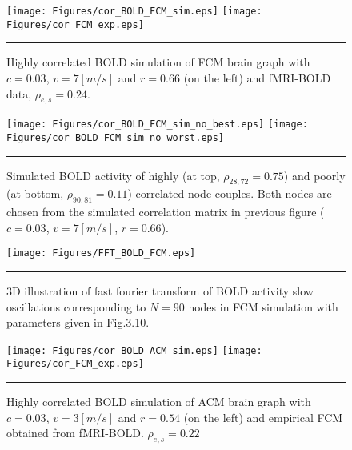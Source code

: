 \begin{figure}[htbp]
 
  \centering
	 \texttt{[image: Figures/cor\_BOLD\_FCM\_sim.eps]} 
   	 \texttt{[image: Figures/cor\_FCM\_exp.eps]} 

    \rule{35em}{0.5pt}
  \caption[High correlated BOLD simulation, FCM]{Highly correlated BOLD simulation of FCM brain graph with $c=0.03$, $v=7 [m/s]$ and $r=0.66$ (on the left) and fMRI-BOLD data, $\rho_{e,s} = 0.24$.} 
    \label{fig:High correlated BOLD simulation, FCM}
 	
\end{figure}  





\begin{figure}[htbp]
 
  \centering
	 \texttt{[image: Figures/cor\_BOLD\_FCM\_sim\_no\_best.eps]} 
   	 \texttt{[image: Figures/cor\_BOLD\_FCM\_sim\_no\_worst.eps]} 

    \rule{35em}{0.5pt}
  \caption[BOLD Activity Node Dynamics, FCM]{Simulated BOLD activity of highly (at top, $\rho_{28,72}=0.75$) and poorly (at bottom, $\rho_{90,81}=0.11$) correlated node couples. Both nodes are chosen from the simulated correlation matrix in previous figure ($c=0.03$, $v=7 [m/s]$, $r=0.66$).} 
    \label{fig:BOLD Activity Node Dynamics, FCM}
 	
\end{figure} 



\begin{figure}[htbp]
 
  \centering
	 \texttt{[image: Figures/FFT\_BOLD\_FCM.eps]} 

    \rule{35em}{0.5pt}
  \caption[3D Fast Fourier Transform, BOLD, FCM]{3D illustration of fast fourier transform of BOLD activity slow oscillations corresponding to $N=90$ nodes in FCM simulation with parameters given in Fig.3.10.} 
    \label{fig:3D Fast Fourier Transform, BOLD, FCM}
 	
\end{figure}  


\begin{figure}[htbp]
 
  \centering
	 \texttt{[image: Figures/cor\_BOLD\_ACM\_sim.eps]} 
   	 \texttt{[image: Figures/cor\_FCM\_exp.eps]} 

    \rule{35em}{0.5pt}
  \caption[High correlated BOLD simulation, ACM]{Highly correlated BOLD simulation of ACM brain graph with $c=0.03$, $v=3 [m/s]$ and $r=0.54$ (on the left) and empirical FCM obtained from fMRI-BOLD. $\rho_{e,s} = 0.22$} 
    \label{fig:High correlated BOLD simulation, ACM}
 	
\end{figure}  




